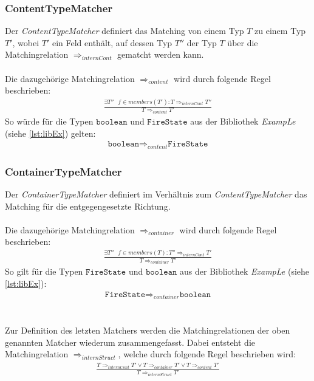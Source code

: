 \subsubsection{ContentTypeMatcher}
Der \emph{ContentTypeMatcher} definiert das Matching von einem Typ $T$ zu einem Typ $T'$, wobei $T'$ ein Feld enthält, auf dessen Typ $T''$ der Typ $T$ über die Matchingrelation $\Rightarrow_{internCont}$ gematcht werden kann.
\\\\
Die dazugehörige Matchingrelation $\Rightarrow_{content}$ wird durch folgende Regel beschrieben:
\begin{gather*}
\frac{\exists \mathit{T''\text{ }f}\in members(T'): T \Rightarrow_{internCont} T''}{T \Rightarrow_{content} T'}
\end{gather*}
\noindent
So würde für die Typen $\texttt{boolean}$ und $\texttt{FireState}$ aus der Bibliothek \emph{ExampLe} (siehe \ref{lst:libEx}) gelten: 
\begin{gather*}
\texttt{boolean} \Rightarrow_{content} \texttt{FireState}
\end{gather*}
\subsubsection{ContainerTypeMatcher}
Der \emph{ContainerTypeMatcher} definiert im Verhältnis zum \emph{ContentTypeMatcher} das Matching für die entgegengesetzte Richtung.
\\\\
Die dazugehörige Matchingrelation $\Rightarrow_{container}$ wird durch folgende Regel beschrieben:
\begin{gather*}
\frac{\exists \mathit{T''\text{ }f}\in members(T): T'' \Rightarrow_{internCont} T'}{T \Rightarrow_{container} T'}
\end{gather*}
\noindent
So gilt für die Typen $\texttt{FireState}$ und $\texttt{boolean}$ aus der Bibliothek \emph{ExampLe} (siehe \ref{lst:libEx}): 
\begin{gather*}
\texttt{FireState} \Rightarrow_{container} \texttt{boolean}
\end{gather*}
\\\\
Zur Definition des letzten Matchers werden die Matchingrelationen der oben genannten Matcher wiederum zusammengefasst. Dabei entsteht die Matchingrelation $\Rightarrow_{internStruct}$, welche durch folgende Regel beschrieben wird:
\begin{gather*}
\frac{T \Rightarrow_{internCont}T' \vee T \Rightarrow_{container} T' \vee T \Rightarrow_{content} T'}{T \Rightarrow_{internStruct}T'}
\end{gather*}
